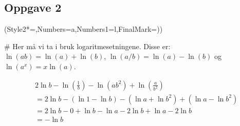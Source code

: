 \subsection*{Oppgave 2}
\begin{easylist}[enumerate]
	\ListProperties(Style2*=,Numbers=a,Numbers1=l,FinalMark={)})
	
	# Her må vi ta i bruk logaritmesetningene. Disse er: 
	$\ln(ab) = \ln(a) + \ln(b)$, 
	$\ln\left(a / b\right) = \ln(a) - \ln(b)$ og 
	$\ln(a^x) = x \ln(a)$.
	
	\begin{align*}
		& 2 \ln b - \ln \left(\frac{1}{b} \right) - \ln (ab^2) + \ln \left(\frac{a}{b^2}\right) \\
		& = 2 \ln b - (\ln 1 - \ln b) - (\ln a + \ln b^2) + (\ln a - \ln b^2) \\
		& = 2 \ln b - 0 + \ln b - \ln a - 2 \ln b + \ln a - 2\ln b \\
		& = - \ln b	
	\end{align*}
	
	
\end{easylist}	

